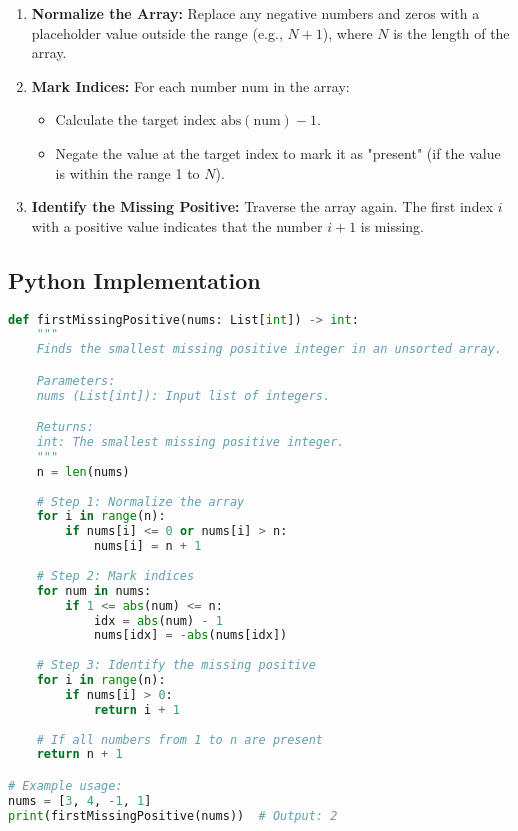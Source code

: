 \begin{enumerate}
    \item \textbf{Normalize the Array:} Replace any negative numbers and zeros with a placeholder value outside the range (e.g., \( N+1 \)), where \( N \) is the length of the array.
    
    \item \textbf{Mark Indices:} For each number \( \text{num} \) in the array:
        \begin{itemize}
            \item Calculate the target index \( \text{abs}(\text{num}) - 1 \).
            \item Negate the value at the target index to mark it as "present" (if the value is within the range 1 to \( N \)).
        \end{itemize}
    
    \item \textbf{Identify the Missing Positive:} Traverse the array again. The first index \( i \) with a positive value indicates that the number \( i+1 \) is missing.
\end{enumerate}

\subsection*{Python Implementation}
\begin{fullwidth}
\begin{lstlisting}[language=Python]
def firstMissingPositive(nums: List[int]) -> int:
    """
    Finds the smallest missing positive integer in an unsorted array.

    Parameters:
    nums (List[int]): Input list of integers.

    Returns:
    int: The smallest missing positive integer.
    """
    n = len(nums)
    
    # Step 1: Normalize the array
    for i in range(n):
        if nums[i] <= 0 or nums[i] > n:
            nums[i] = n + 1
    
    # Step 2: Mark indices
    for num in nums:
        if 1 <= abs(num) <= n:
            idx = abs(num) - 1
            nums[idx] = -abs(nums[idx])
    
    # Step 3: Identify the missing positive
    for i in range(n):
        if nums[i] > 0:
            return i + 1
    
    # If all numbers from 1 to n are present
    return n + 1

# Example usage:
nums = [3, 4, -1, 1]
print(firstMissingPositive(nums))  # Output: 2
\end{lstlisting}
\end{fullwidth}

